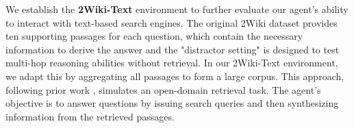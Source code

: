 We establish the \textbf{2Wiki-Text} environment to further evaluate our agent's ability to interact with text-based search engines.
The original 2Wiki dataset provides ten supporting passages for each question, which contain the necessary information to derive the answer and the "distractor setting" is designed to test multi-hop reasoning abilities without retrieval.
In our 2Wiki-Text environment, we adapt this by aggregating all passages to form a large corpus.
This approach, following  prior work \citep{IRCoT, aguerrebere2023similarity}, simulates an open-domain retrieval task.
The agent's objective is to answer questions by issuing search queries  and then synthesizing information from the retrieved passages.







